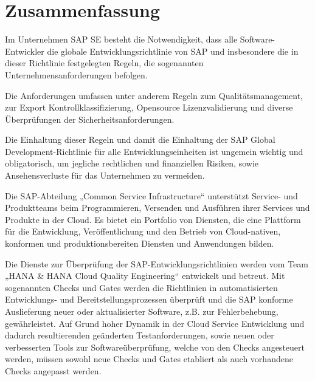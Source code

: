 \documentclass[
	12pt, %
	a4paper,
	liststotoc, %
	bibtotoc, %
	pointlessnumbers, %
	ngerman, %
	headsepline, %
	oneside %
	]{scrbook} %
\begin{document}
\onehalfspacing %


\chapter*{Zusammenfassung}

Im Unternehmen SAP SE besteht die Notwendigkeit, dass alle Software-Entwickler die globale Entwicklungsrichtlinie von SAP und insbesondere die in dieser Richtlinie festgelegten Regeln, die sogenannten Unternehmensanforderungen befolgen.

Die Anforderungen umfassen unter anderem Regeln zum Qualitätsmanagement, zur Export Kontrollklassifizierung, Opensource Lizenzvalidierung und diverse Überprüfungen der Sicherheitsanforderungen.

Die Einhaltung dieser Regeln und damit die Einhaltung der SAP Global Development-Richtlinie für alle Entwicklungseinheiten ist ungemein wichtig und obligatorisch, um jegliche rechtlichen und finanziellen Risiken, sowie Ansehensverluste für das Unternehmen zu vermeiden.

Die SAP-Abteilung „Common Service Infrastructure“ unterstützt Service- und Produktteams beim Programmieren, Versenden und Ausführen ihrer Services und Produkte in der Cloud.
 Es bietet ein Portfolio von Diensten, die eine Plattform für die Entwicklung, Veröffentlichung und den Betrieb von Cloud-nativen, konformen und produktionsbereiten Diensten und Anwendungen bilden.

Die Dienste zur Überprüfung der SAP-Entwicklungsrichtlinien werden vom Team „HANA \& HANA Cloud Quality Engineering“ entwickelt und betreut.
Mit sogenannten Checks und Gates werden die Richtlinien in automatisierten Entwicklungs- und Bereitstellungsprozessen überprüft und die SAP konforme Auslieferung neuer oder aktualisierter Software, z.B. zur Fehlerbehebung, gewährleistet.
 Auf Grund hoher Dynamik in der Cloud Service Entwicklung und dadurch resultierenden geänderten Testanforderungen, sowie neuen oder verbesserten Tools zur Softwareüberprüfung, welche von den Checks angesteuert werden, müssen sowohl neue Checks und Gates etabliert als auch vorhandene Checks angepasst werden.
\end{document}
